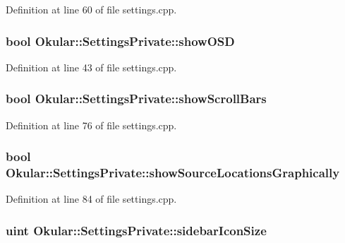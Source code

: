 Definition at line 60 of file settings.\+cpp.

\hypertarget{classOkular_1_1SettingsPrivate_a345bba4c3b0a87f52cb0b01dc023c754}{
\subsubsection[{show\+O\+S\+D}]{\setlength{\rightskip}{0pt plus 5cm}bool Okular\+::\+Settings\+Private\+::show\+O\+S\+D}}\label{classOkular_1_1SettingsPrivate_a345bba4c3b0a87f52cb0b01dc023c754}


Definition at line 43 of file settings.\+cpp.

\hypertarget{classOkular_1_1SettingsPrivate_a9d05cb4daab39a953cbd862bff2fe47c}{
\subsubsection[{show\+Scroll\+Bars}]{\setlength{\rightskip}{0pt plus 5cm}bool Okular\+::\+Settings\+Private\+::show\+Scroll\+Bars}}\label{classOkular_1_1SettingsPrivate_a9d05cb4daab39a953cbd862bff2fe47c}


Definition at line 76 of file settings.\+cpp.

\hypertarget{classOkular_1_1SettingsPrivate_af23f52eb1e6c8cf84cbbe9683b9866ed}{
\subsubsection[{show\+Source\+Locations\+Graphically}]{\setlength{\rightskip}{0pt plus 5cm}bool Okular\+::\+Settings\+Private\+::show\+Source\+Locations\+Graphically}}\label{classOkular_1_1SettingsPrivate_af23f52eb1e6c8cf84cbbe9683b9866ed}


Definition at line 84 of file settings.\+cpp.

\hypertarget{classOkular_1_1SettingsPrivate_aaf8c234fb36d75db4b97f0f46f0828b7}{
\subsubsection[{sidebar\+Icon\+Size}]{\setlength{\rightskip}{0pt plus 5cm}uint Okular\+::\+Settings\+Private\+::sidebar\+Icon\+Size}}\label{classOkular_1_1SettingsPrivate_aaf8c234fb36d75db4b97f0f46f0828b7}



